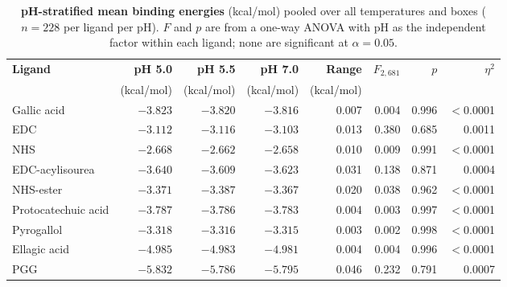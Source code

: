 \documentclass[11pt]{article}
\begin{document}
\begin{table}[H]
\small
\centering
\caption{\textbf{pH-stratified mean binding energies} (kcal/mol) pooled over
  all temperatures and boxes ($n = 228$ per ligand per pH).
  $F$ and $p$ are from a one-way ANOVA with pH as the independent factor
  within each ligand; none are significant at $\alpha = 0.05$.}
\label{tab:si_ph_stratified}
\begin{tabular}{lrrrrrrr}
\toprule
\textbf{Ligand} & \textbf{pH 5.0} & \textbf{pH 5.5} & \textbf{pH 7.0}
  & \textbf{Range} & \textbf{$F_{2,681}$} & \textbf{$p$} & \textbf{$\eta^2$} \\
 & (kcal/mol) & (kcal/mol) & (kcal/mol) & (kcal/mol) & & & \\
\midrule
Gallic acid          & $-3.823$ & $-3.820$ & $-3.816$ & 0.007 & 0.004 & 0.996 & $<$0.0001 \\
EDC                  & $-3.112$ & $-3.116$ & $-3.103$ & 0.013 & 0.380 & 0.685 & 0.0011    \\
NHS                  & $-2.668$ & $-2.662$ & $-2.658$ & 0.010 & 0.009 & 0.991 & $<$0.0001 \\
EDC-acylisourea      & $-3.640$ & $-3.609$ & $-3.623$ & 0.031 & 0.138 & 0.871 & 0.0004    \\
NHS-ester            & $-3.371$ & $-3.387$ & $-3.367$ & 0.020 & 0.038 & 0.962 & $<$0.0001 \\
Protocatechuic acid  & $-3.787$ & $-3.786$ & $-3.783$ & 0.004 & 0.003 & 0.997 & $<$0.0001 \\
Pyrogallol           & $-3.318$ & $-3.316$ & $-3.315$ & 0.003 & 0.002 & 0.998 & $<$0.0001 \\
Ellagic acid         & $-4.985$ & $-4.983$ & $-4.981$ & 0.004 & 0.004 & 0.996 & $<$0.0001 \\
PGG                  & $-5.832$ & $-5.786$ & $-5.795$ & 0.046 & 0.232 & 0.791 & 0.0007    \\
\bottomrule
\end{tabular}
\end{table}
\end{document}

